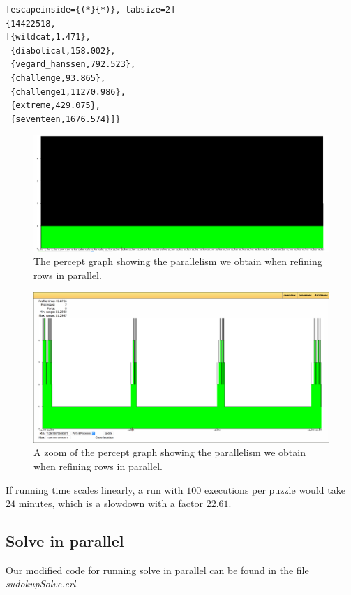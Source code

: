\documentclass[a4paper]{article}
\begin{document}
\begin{lstlisting}[escapeinside={(*}{*)}, tabsize=2]
{14422518,
[{wildcat,1.471},
 {diabolical,158.002},
 {vegard_hanssen,792.523},
 {challenge,93.865},
 {challenge1,11270.986},
 {extreme,429.075},
 {seventeen,1676.574}]}
\end{lstlisting}

\begin{figure}[!htb]
\begin{center}
\includegraphics[scale=0.2]{refine_in_parallel}
\caption{The percept graph showing the parallelism we obtain when refining rows in parallel.}
\label{fig:refpar}
\end{center}
\end{figure}
\begin{figure}[!htb]
\begin{center}
\includegraphics[scale=0.2]{refine_in_parallel_zoom}
\caption{A zoom of the percept graph showing the parallelism we obtain when refining rows in parallel.}
\label{fig:refparzoom}
\end{center}
\end{figure}
 
If running time scales linearly, a run with $100$ executions per puzzle would take $24$ minutes, which is a slowdown with a factor $22.61$.

\subsection{Solve in parallel}
Our modified code for running solve in parallel can be found in the file \textit{sudoku\textunderscore pSolve.erl}.
\end{document}
